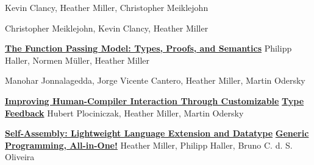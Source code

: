 \documentclass[9pt]{article}
\begin{document}
\medskip



\dates{}
\newline\noindent Kevin Clancy, Heather Miller, Christopher Meiklejohn
\medskip

\dates{}
\newline\noindent Christopher Meiklejohn, Kevin Clancy, Heather Miller
\medskip

{}
 \medskip


\noindent\href{https://infoscience.epfl.ch/record/221395}{\bf The Function Passing Model: Types, Proofs, and Semantics}
\newline\noindent Philipp Haller, Normen M\"{u}ller, Heather Miller
\medskip

\newline\noindent Manohar Jonnalagedda, Jorge Vicente Cantero, Heather Miller, Martin Odersky
\medskip

\noindent\href{https://infoscience.epfl.ch/record/197948}{\bf Improving Human-Compiler Interaction Through Customizable} \vspace{-0.03in}
\newline\noindent\href{https://infoscience.epfl.ch/record/197948}{\bf Type Feedback}\dates{}
\newline\noindent Hubert Plociniczak, Heather Miller, Martin Odersky
\medskip

\noindent\href{https://infoscience.epfl.ch/record/199389}{\bf Self-Assembly: Lightweight Language Extension and Datatype}\vspace{-0.03in}
\newline\noindent\href{https://infoscience.epfl.ch/record/199389}{\bf Generic Programming, All-in-One!}\dates{}
\newline\noindent Heather Miller, Philipp Haller, Bruno C. d. S. Oliveira
\medskip
\end{document}
